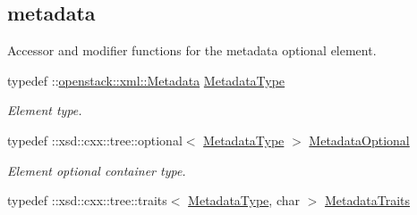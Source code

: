 \subsection*{metadata}
\label{_amgrp9f81f3c07476a0d97f6793673dd8e475}
Accessor and modifier functions for the metadata optional element. \begin{DoxyCompactItemize}
\item 
\hypertarget{classopenstack_1_1xml_1_1Server_a12e6d87c51b547ab02415dd396094752}{
typedef ::\hyperlink{classopenstack_1_1xml_1_1Metadata}{openstack::xml::Metadata} \hyperlink{classopenstack_1_1xml_1_1Server_a12e6d87c51b547ab02415dd396094752}{MetadataType}}
\label{classopenstack_1_1xml_1_1Server_a12e6d87c51b547ab02415dd396094752}

\begin{DoxyCompactList}\small\item\em Element type. \item\end{DoxyCompactList}\item 
\hypertarget{classopenstack_1_1xml_1_1Server_a741c48a3af02435ec4a8b6aefd1f8fb5}{
typedef ::xsd::cxx::tree::optional$<$ \hyperlink{classopenstack_1_1xml_1_1Metadata}{MetadataType} $>$ \hyperlink{classopenstack_1_1xml_1_1Server_a741c48a3af02435ec4a8b6aefd1f8fb5}{MetadataOptional}}
\label{classopenstack_1_1xml_1_1Server_a741c48a3af02435ec4a8b6aefd1f8fb5}

\begin{DoxyCompactList}\small\item\em Element optional container type. \item\end{DoxyCompactList}\item 
\hypertarget{classopenstack_1_1xml_1_1Server_a5b4f1e13fec2c8a60eb0ba24bae5508b}{
typedef ::xsd::cxx::tree::traits$<$ \hyperlink{classopenstack_1_1xml_1_1Metadata}{MetadataType}, char $>$ \hyperlink{classopenstack_1_1xml_1_1Server_a5b4f1e13fec2c8a60eb0ba24bae5508b}{MetadataTraits}}
\label{classopenstack_1_1xml_1_1Server_a5b4f1e13fec2c8a60eb0ba24bae5508b}


\end{DoxyCompactItemize}

